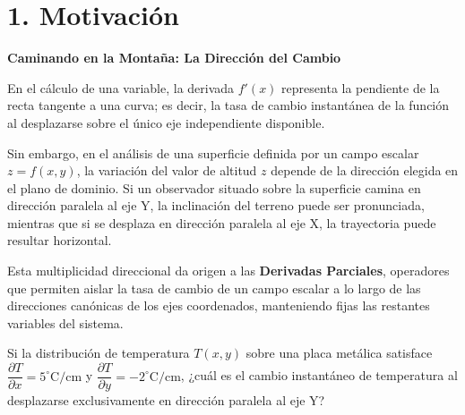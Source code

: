 \documentclass[11pt]{article}
\newenvironment{motivacion}{%
  \section*{1. Motivación}%
}{}
\newenvironment{preguntaguia}{%
  \begin{tcolorbox}[colback=cyan!5,colframe=cyan!75!black,title=Pregunta Guía]%
}{%
  \end{tcolorbox}%
}
\begin{document}
\begin{motivacion}
  \textbf{Caminando en la Montaña: La Dirección del Cambio}

  En el cálculo de una variable, la derivada $f'(x)$ representa la pendiente de la recta tangente a una curva; es decir, la tasa de cambio instantánea de la función al desplazarse sobre el único eje independiente disponible.
  
  Sin embargo, en el análisis de una superficie definida por un campo escalar $z = f(x,y)$, la variación del valor de altitud $z$ depende de la dirección elegida en el plano de dominio. Si un observador situado sobre la superficie camina en dirección paralela al eje Y, la inclinación del terreno puede ser pronunciada, mientras que si se desplaza en dirección paralela al eje X, la trayectoria puede resultar horizontal.
  
  Esta multiplicidad direccional da origen a las \textbf{Derivadas Parciales}, operadores que permiten aislar la tasa de cambio de un campo escalar a lo largo de las direcciones canónicas de los ejes coordenados, manteniendo fijas las restantes variables del sistema.

  \begin{preguntaguia}
    Si la distribución de temperatura $T(x,y)$ sobre una placa metálica satisface $\displaystyle \dfrac{\partial T}{\partial x} = 5^\circ\text{C/cm}$ y $\displaystyle \dfrac{\partial T}{\partial y} = -2^\circ\text{C/cm}$, ¿cuál es el cambio instantáneo de temperatura al desplazarse exclusivamente en dirección paralela al eje Y?
  \end{preguntaguia}
\end{motivacion}
\end{document}
